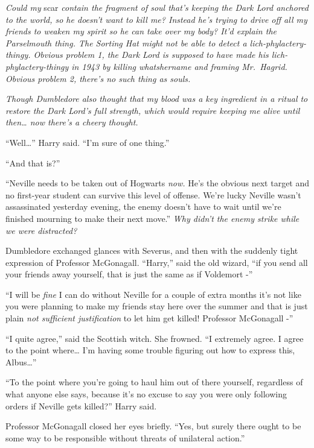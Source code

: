 \emph{Could my} scar \emph{contain the fragment of soul that's keeping
the Dark Lord anchored to the world, so he doesn't want to kill me?
Instead he's trying to drive off all my friends to weaken my spirit so
he can take over my body? It'd explain the Parselmouth thing. The
Sorting Hat might not be able to detect a lich-phylactery-thingy.
Obvious problem 1, the Dark Lord is supposed to have made his
lich-phylactery-thingy in 1943 by killing whatshername and framing
Mr.~Hagrid. Obvious problem 2, there's no such thing as souls.}

\emph{Though Dumbledore also thought that my blood was a key ingredient
in a ritual to restore the Dark Lord's full strength, which would
require keeping me alive until then\ldots{} now there's a cheery
thought.}

``Well\ldots{}'' Harry said. ``I'm sure of one thing.''

``And that is?''

``Neville needs to be taken out of Hogwarts \emph{now.} He's the obvious
next target and no first-year student can survive this level of offense.
We're lucky Neville wasn't assassinated yesterday evening, the enemy
doesn't have to wait until we're finished mourning to make their next
move.'' \emph{Why didn't the enemy strike while we were distracted?}

Dumbledore exchanged glances with Severus, and then with the suddenly
tight expression of Professor McGonagall. ``Harry,'' said the old
wizard, ``if you send all your friends away yourself, that is just the
same as if Voldemort -''

``I will be \emph{fine} I can do without Neville for a couple of extra
months it's not like you were planning to make my friends stay here over
the summer and that is just plain \emph{not sufficient justification} to
let him get killed! Professor McGonagall -''

``I quite agree,'' said the Scottish witch. She frowned. ``I extremely
agree. I agree to the point where\ldots{} I'm having some trouble
figuring out how to express this, Albus\ldots{}''

``To the point where you're going to haul him out of there yourself,
regardless of what anyone else says, because it's no excuse to say you
were only following orders if Neville gets killed?'' Harry said.

Professor McGonagall closed her eyes briefly. ``Yes, but surely there
ought to be some way to be responsible without threats of unilateral
action.''

